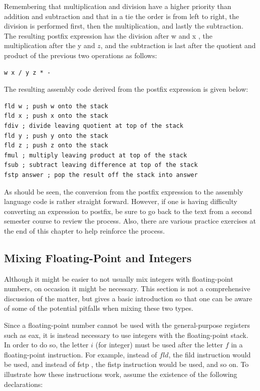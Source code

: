 \documentclass[10pt]{book}
\begin{document}
Remembering that multiplication and division have a higher priority than addition and subtraction and that in a tie the order is from left to right, the division is performed first, then the multiplication, and lastly the subtraction. The resulting postfix expression has the division after w and x , the multiplication after the y and $z$, and the subtraction is last after the quotient and product of the previous two operations as follows:

\begin{verbatim}
w x / y z * -
\end{verbatim}

The resulting assembly code derived from the postfix expression is given below:

\begin{verbatim}
fld w ; push w onto the stack
fld x ; push x onto the stack
fdiv ; divide leaving quotient at top of the stack
fld y ; push y onto the stack
fld z ; push z onto the stack
fmul ; multiply leaving product at top of the stack
fsub ; subtract leaving difference at top of the stack
fstp answer ; pop the result off the stack into answer
\end{verbatim}

As should be seen, the conversion from the postfix expression to the assembly language code is rather straight forward. However, if one is having difficulty converting an expression to postfix, be sure to go back to the text from a second semester course to review the process. Also, there are various practice exercises at the end of this chapter to help reinforce the process.

\subsection{Mixing Floating-Point and Integers}
Although it might be easier to not usually mix integers with floating-point numbers, on occasion it might be necessary. This section is not a comprehensive discussion of the matter, but gives a basic introduction so that one can be aware of some of the potential pitfalls when mixing these two types.

Since a floating-point number cannot be used with the general-purpose registers such as eax, it is instead necessary to use integers with the floating-point stack. In order to do so, the letter $i$ (for integer) must be used after the letter $f$ in a floating-point instruction. For example, instead of $f l d$, the fild instruction would be used, and instead of fstp , the fistp instruction would be used, and so on. To illustrate how these instructions work, assume the existence of the following declarations:
\end{document}
